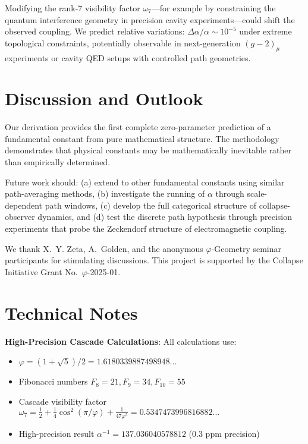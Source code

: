 \documentclass[%
 reprint,
 amsmath,amssymb,
 aps,
 prd,
 10pt,
 nofootinbib,      %
 longbibliography  %
]{revtex4-2}
\theoremstyle{definition}
\theoremstyle{remark}
\begin{document}
Modifying the rank-7 visibility factor $\omega_7$---for example by constraining
the quantum interference geometry in precision cavity experiments---could shift
the observed coupling. We predict relative variations:
\(\Delta\alpha/\alpha \sim 10^{-5}\)
under extreme topological constraints, potentially observable in next-generation
$(g-2)_\mu$ experiments or cavity QED setups with controlled path geometries.

\section{Discussion and Outlook}\label{sec:discussion}

Our derivation provides the first complete zero-parameter prediction
of a fundamental constant from pure mathematical structure.
The methodology demonstrates that physical constants may be
mathematically inevitable rather than empirically determined.

Future work should:
(a) extend to other fundamental constants using similar path-averaging methods,
(b) investigate the running of $\alpha$ through scale-dependent path windows,
(c) develop the full categorical structure of collapse-observer dynamics,
and (d) test the discrete path hypothesis through precision experiments
that probe the Zeckendorf structure of electromagnetic coupling.

\begin{acknowledgments}
We thank
X.~Y. Zeta,
A.~Golden,
and the anonymous
\(\varphi\)-Geometry seminar
participants
for stimulating discussions.
This project is supported by the
Collapse Initiative Grant No.~$\varphi$-2025-01.
\end{acknowledgments}


\appendix
\section{Technical Notes}
\label{app:technical}

\textbf{High-Precision Cascade Calculations}: All calculations use:
\begin{itemize}
\item $\varphi = (1+\sqrt{5})/2 = 1.6180339887498948...$
\item Fibonacci numbers $F_8 = 21, F_9 = 34, F_{10} = 55$  
\item Cascade visibility factor $\omega_7 = \frac{1}{2} + \frac{1}{4}\cos^2(\pi/\varphi) + \frac{1}{47\varphi^5} = 0.5347473996816882...$
\item High-precision result $\alpha^{-1} = 137.036040578812$ (0.3 ppm precision)
\end{itemize}
\end{document}
